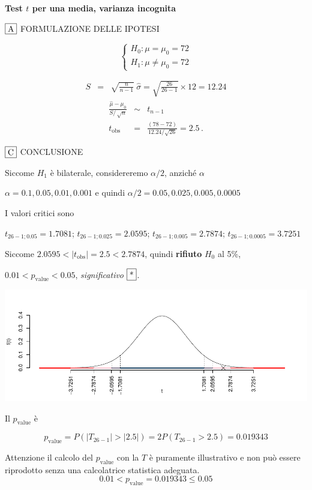 \documentclass[
  11pt,
]{book}
\theoremstyle{mytheoremstyle}
\theoremstyle{mydefstyle}
\newenvironment{sol}
  {
  \begin{tcolorbox}[enhanced,breakable,arc=0.1mm,boxrule=1pt,colback=white,colframe=iblue,
  title=\bf \fontfamily{lmss}\selectfont \hspace{.5 cm} Soluzione,drop fuzzy shadow]

}{
\end{tcolorbox}
  }
\begin{document}
\begin{sol}
\textbf{Test \(t\) per una media, varianza incognita}

\(\fbox{A}\) FORMULAZIONE DELLE IPOTESI

\[\begin{cases}
   H_0: \mu = \mu_0=72 \\
   H_1: \mu \neq \mu_0=72 
   \end{cases}\]

\begin{eqnarray*}
   S    &=& \sqrt{\frac{n} {n-1}}\ \widehat{\sigma} 
   =  \sqrt{\frac{ 26 } { 26 -1}} \times  12  =  12.24 
   \end{eqnarray*}
\begin{eqnarray*}
   \frac{\hat\mu - \mu_{0}} {S/\,\sqrt{n}}&\sim&t_{n-1}\\
   t_{\text{obs}}
   &=& \frac{ ( 78 -  72 )} { 12.24 /\sqrt{ 26 }}
   =   2.5 \, .
   \end{eqnarray*}

\(\fbox{C}\) CONCLUSIONE

Siccome \(H_1\) è bilaterale, considereremo \(\alpha/2\),
anziché \(\alpha\)

\(\alpha=0.1, 0.05, 0.01, 0.001\) e quindi \(\alpha/2=0.05, 0.025, 0.005, 0.0005\)

I valori critici sono

\(t_{26-1;0.05}=1.7081\); \(t_{26-1;0.025}=2.0595\); \(t_{26-1;0.005}=2.7874\); \(t_{26-1;0.0005}=3.7251\)

Siccome \(2.0595<|t_\text{obs}|=2.5<2.7874\), quindi \textbf{rifiuto} \(H_0\) al 5\%,

\(0.01<p_\text{value}<0.05\), \emph{significativo} \(\fbox{*}\).

\begin{center}\includegraphics{Esami_passati_con_soluzioni_files/figure-latex/05-test-12,-1} \end{center}

Il \(p_{\text{value}}\) è

\[ p_{\text{value}} = P(|T_{26-1}|>|2.5|)=2P(T_{26-1}>2.5)=0.019343 \]

Attenzione il calcolo del \(p_\text{value}\) con la \(T\) è puramente illustrativo e non può essere riprodotto senza una calcolatrice statistica adeguata.\[
 0.01 < p_\text{value}= 0.019343 \leq 0.05 
\]

\end{sol}
\end{document}

